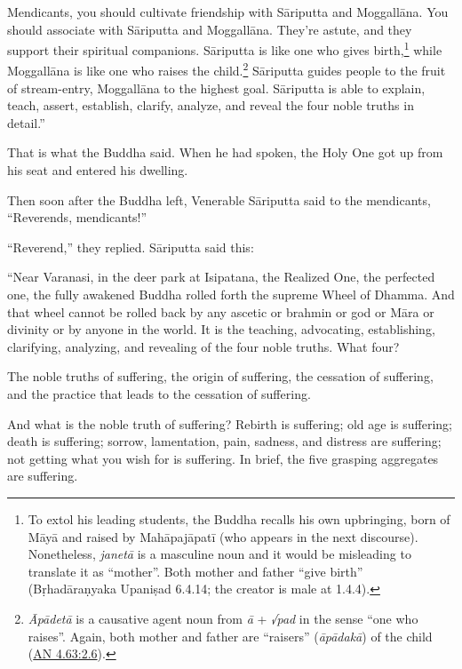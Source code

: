 \documentclass[12pt,openany]{book}%
\begin{document}
Mendicants, you should cultivate friendship with \textsanskrit{Sāriputta} and \textsanskrit{Moggallāna}. You should associate with \textsanskrit{Sāriputta} and \textsanskrit{Moggallāna}. They’re astute, and they support their spiritual companions. \textsanskrit{Sāriputta} is like one who gives birth,\footnote{To extol his leading students, the Buddha recalls his own upbringing, born of \textsanskrit{Māyā} and raised by \textsanskrit{Mahāpajāpatī} (who appears in the next discourse). Nonetheless, \textit{\textsanskrit{janetā}} is a masculine noun and it would be misleading to translate it as “mother”. Both mother and father “give birth” (\textsanskrit{Bṛhadāraṇyaka} \textsanskrit{Upaniṣad} 6.4.14; the creator is male at 1.4.4). } while \textsanskrit{Moggallāna} is like one who raises the child.\footnote{\textit{\textsanskrit{Āpādetā}} is a causative agent noun from \textit{\textsanskrit{ā}} + \textit{√pad} in the sense “one who raises”. Again, both mother and father are “raisers” (\textit{\textsanskrit{āpādakā}}) of the child (\href{https://suttacentral.net/an4.63/en/sujato\#2.6}{AN 4.63:2.6}). } \textsanskrit{Sāriputta} guides people to the fruit of stream-entry, \textsanskrit{Moggallāna} to the highest goal. \textsanskrit{Sāriputta} is able to explain, teach, assert, establish, clarify, analyze, and reveal the four noble truths in detail.” 

That is what the Buddha said. When he had spoken, the Holy One got up from his seat and entered his dwelling. 

Then soon after the Buddha left, Venerable \textsanskrit{Sāriputta} said to the mendicants, “Reverends, mendicants!” 

“Reverend,” they replied. \textsanskrit{Sāriputta} said this: 

“Near Varanasi, in the deer park at Isipatana, the Realized One, the perfected one, the fully awakened Buddha rolled forth the supreme Wheel of Dhamma. And that wheel cannot be rolled back by any ascetic or brahmin or god or \textsanskrit{Māra} or divinity or by anyone in the world. It is the teaching, advocating, establishing, clarifying, analyzing, and revealing of the four noble truths. What four? 

The noble truths of suffering, the origin of suffering, the cessation of suffering, and the practice that leads to the cessation of suffering. 

And what is the noble truth of suffering? Rebirth is suffering; old age is suffering; death is suffering; sorrow, lamentation, pain, sadness, and distress are suffering; not getting what you wish for is suffering. In brief, the five grasping aggregates are suffering. 
\end{document}
